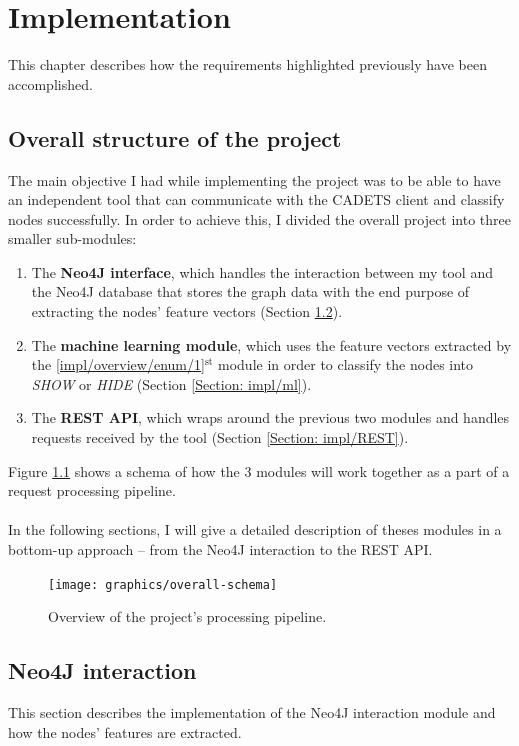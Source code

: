 
	\chapter{Implementation}
	This chapter describes how the requirements highlighted previously have been accomplished. 
	\section{Overall structure of the project} \label{Section: impl/overview}
	The main objective I had while implementing the project was to be able to have an independent tool that can communicate with the CADETS client and classify nodes successfully. In order to achieve this, I divided the overall project into three smaller sub-modules:
	\begin{enumerate}
		\item \label{impl/overview/enum/1} The \textbf{Neo4J interface}, which handles the interaction between my tool and the Neo4J database that stores the graph data with the end purpose of extracting the nodes' feature vectors (Section \ref{Section: impl/neo4j}).
		
		\item The \textbf{machine learning module}, which uses the feature vectors extracted by the \ref{impl/overview/enum/1}$^{\text{st}}$ module in order to classify the nodes into \textit{SHOW} or \textit{HIDE} (Section \ref{Section: impl/ml}).
		
		\item The \textbf{REST API}, which wraps around the previous two modules and handles requests received by the tool (Section \ref{Section: impl/REST}).
	\end{enumerate}
	Figure \ref{Fig: impl/pipeline} shows a schema of how the 3 modules will work together as a part of a request processing pipeline. 
	\\ \\
	In the following sections, I will give a detailed description of theses modules in a bottom-up approach -- from the Neo4J interaction to the REST API. 
	\begin{figure}[H]
		\centering
		\texttt{[image: graphics/overall-schema]}	
		\caption[Processing pipeline]{Overview of the project's processing pipeline.}
		\label{Fig: impl/pipeline}
	\end{figure}
	\section{Neo4J interaction} \label{Section: impl/neo4j}
	This section describes the implementation of the Neo4J interaction module and how the nodes' features are extracted. 
